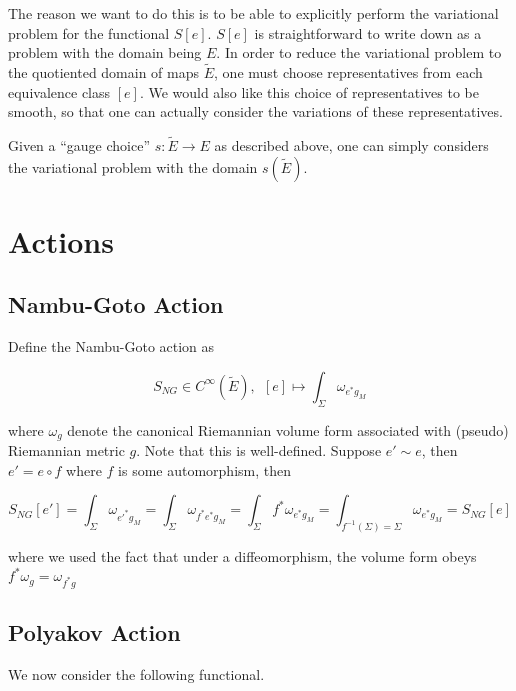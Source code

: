 \documentclass{article}
\begin{document}
                The reason we want to do this is to be able to explicitly perform the variational problem for the functional $S[e]$. $S[e]$ is straightforward to write down as a problem with the domain being $E$. In order to reduce the variational problem to the quotiented domain of maps $\tilde E$, one must choose representatives from each equivalence class $[e]$. We would also like this choice of representatives to be smooth, so that one can actually consider the variations of these representatives.

                Given a ``gauge choice'' $s: \tilde E \to E$ as described above, one can simply considers the variational problem with the domain $s(\tilde E)$.


        \section{Actions}

            \subsection{Nambu-Goto Action}
                Define the Nambu-Goto action as

                \begin{equation}
                    S_{NG} \in C^\infty(\tilde E), ~~ [e] \mapsto \int_\Sigma \omega_{e^*g_M}
                \end{equation}

                where $\omega_g$ denote the canonical Riemannian volume form associated with (pseudo) Riemannian metric $g$. Note that this is well-defined. Suppose $e' \sim e$, then $e' = e \circ f$ where $f$ is some automorphism, then

                \begin{equation}
                    S_{NG}[e'] = \int_\Sigma \omega_{e'^*g_M} = \int_\Sigma \omega_{f^*e^*g_M} = \int_\Sigma f^* \omega_{e^* g_M} = \int_{f^{-1}(\Sigma) = \Sigma} \omega_{e^* g_M} = S_{NG}[e]
                \end{equation}

                where we used the fact that under a diffeomorphism, the volume form obeys $f^*\omega_{g} = \omega_{f^*g}$

            \subsection{Polyakov Action}
                We now consider the following functional.
\end{document}
